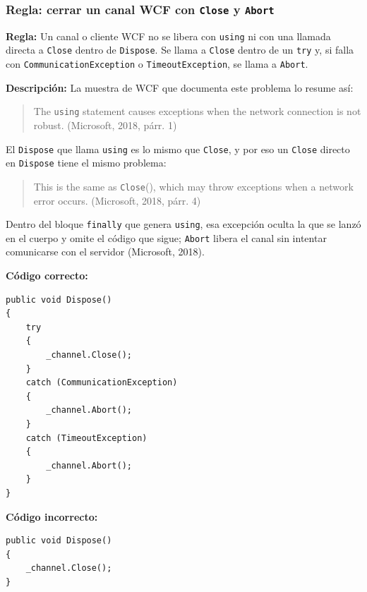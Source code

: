 \subsubsection{Regla: cerrar un canal WCF con \texttt{Close} y \texttt{Abort}}

\textbf{Regla:} Un canal o cliente WCF no se libera con \texttt{using} ni con una llamada directa a \texttt{Close} dentro de \texttt{Dispose}. Se llama a \texttt{Close} dentro de un \texttt{try} y, si falla con \texttt{CommunicationException} o \texttt{TimeoutException}, se llama a \texttt{Abort}.

\textbf{Descripción:} La muestra de WCF que documenta este problema lo resume así:
\begin{quote}
The \texttt{using} statement causes exceptions when the network connection is not robust. (Microsoft, 2018, párr. 1)
\end{quote}
\noindent El \texttt{Dispose} que llama \texttt{using} es lo mismo que \texttt{Close}, y por eso un \texttt{Close} directo en \texttt{Dispose} tiene el mismo problema:
\begin{quote}
This is the same as \texttt{Close}(), which may throw exceptions when a network error occurs. (Microsoft, 2018, párr. 4)
\end{quote}
\noindent Dentro del bloque \texttt{finally} que genera \texttt{using}, esa excepción oculta la que se lanzó en el cuerpo y omite el código que sigue; \texttt{Abort} libera el canal sin intentar comunicarse con el servidor (Microsoft, 2018).

\textbf{Código correcto:}
\begin{lstlisting}[style=csharpstyle]
public void Dispose()
{
    try
    {
        _channel.Close();
    }
    catch (CommunicationException)
    {
        _channel.Abort();
    }
    catch (TimeoutException)
    {
        _channel.Abort();
    }
}
\end{lstlisting}

\textbf{Código incorrecto:}
\begin{lstlisting}[style=csharpstyle]
public void Dispose()
{
    _channel.Close();
}
\end{lstlisting}
